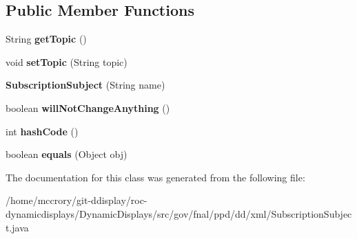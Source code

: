 \subsection*{Public Member Functions}
\begin{DoxyCompactItemize}
\item 
\hypertarget{classgov_1_1fnal_1_1ppd_1_1dd_1_1xml_1_1SubscriptionSubject_a01f2393abc6ac326202690123bda8dad}{String {\bfseries get\-Topic} ()}\label{classgov_1_1fnal_1_1ppd_1_1dd_1_1xml_1_1SubscriptionSubject_a01f2393abc6ac326202690123bda8dad}

\item 
\hypertarget{classgov_1_1fnal_1_1ppd_1_1dd_1_1xml_1_1SubscriptionSubject_a83846589b011cc7e49435511dddb598e}{void {\bfseries set\-Topic} (String topic)}\label{classgov_1_1fnal_1_1ppd_1_1dd_1_1xml_1_1SubscriptionSubject_a83846589b011cc7e49435511dddb598e}

\item 
\hypertarget{classgov_1_1fnal_1_1ppd_1_1dd_1_1xml_1_1SubscriptionSubject_ab9fa2bcb8c215704cd9b51d4e829832c}{{\bfseries Subscription\-Subject} (String name)}\label{classgov_1_1fnal_1_1ppd_1_1dd_1_1xml_1_1SubscriptionSubject_ab9fa2bcb8c215704cd9b51d4e829832c}

\item 
\hypertarget{classgov_1_1fnal_1_1ppd_1_1dd_1_1xml_1_1SubscriptionSubject_aca1d74e3e4b6dccf912b092956c551f8}{boolean {\bfseries will\-Not\-Change\-Anything} ()}\label{classgov_1_1fnal_1_1ppd_1_1dd_1_1xml_1_1SubscriptionSubject_aca1d74e3e4b6dccf912b092956c551f8}

\item 
\hypertarget{classgov_1_1fnal_1_1ppd_1_1dd_1_1xml_1_1SubscriptionSubject_a0c977f51ce1c32fdef687190d23a4ea7}{int {\bfseries hash\-Code} ()}\label{classgov_1_1fnal_1_1ppd_1_1dd_1_1xml_1_1SubscriptionSubject_a0c977f51ce1c32fdef687190d23a4ea7}

\item 
\hypertarget{classgov_1_1fnal_1_1ppd_1_1dd_1_1xml_1_1SubscriptionSubject_af0e768945dc11038a1ae7a298ac328ee}{boolean {\bfseries equals} (Object obj)}\label{classgov_1_1fnal_1_1ppd_1_1dd_1_1xml_1_1SubscriptionSubject_af0e768945dc11038a1ae7a298ac328ee}

\end{DoxyCompactItemize}


The documentation for this class was generated from the following file\-:\begin{DoxyCompactItemize}
\item 
/home/mccrory/git-\/ddisplay/roc-\/dynamicdisplays/\-Dynamic\-Displays/src/gov/fnal/ppd/dd/xml/Subscription\-Subject.\-java\end{DoxyCompactItemize}
